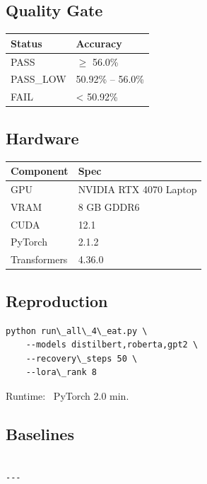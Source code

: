 \subsection{Quality Gate}

\begin{table}[H]
\centering
\small
\begin{tabular}{ll}
\toprule
\textbf{Status} & \textbf{Accuracy} \\
\midrule
PASS & $\ge$ 56.0\% \\
PASS\_LOW & 50.92\% -- 56.0\% \\
FAIL & \textless{} 50.92\% \\
\bottomrule
\end{tabular}
\end{table}

\subsection{Hardware}

\begin{table}[H]
\centering
\small
\begin{tabular}{ll}
\toprule
\textbf{Component} & \textbf{Spec} \\
\midrule
GPU & NVIDIA RTX 4070 Laptop \\
VRAM & 8 GB GDDR6 \\
CUDA & 12.1 \\
PyTorch & 2.1.2 \\
Transformers & 4.36.0 \\
\bottomrule
\end{tabular}
\end{table}

\subsection{Reproduction}

\begin{lstlisting}
python run\_all\_4\_eat.py \
    --models distilbert,roberta,gpt2 \
    --recovery\_steps 50 \
    --lora\_rank 8
\end{lstlisting}

Runtime: ~PyTorch 2.0 min.

\subsection{Baselines}

\begin{lstlisting}

---
\end{lstlisting}

